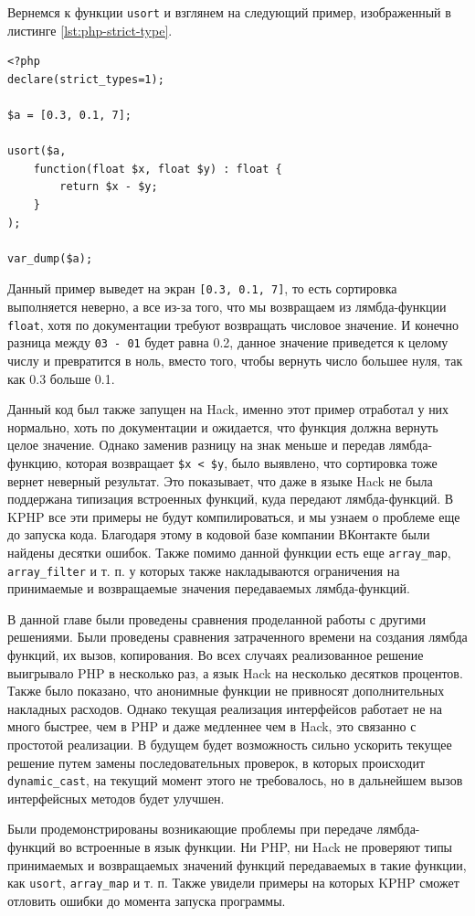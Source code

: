 Вернемся к функции \verb|usort| и взглянем на следующий пример, изображенный в листинге \ref{lst:php-strict-type}.
\begin{lstlisting}[caption={Пример типизации в PHP7}, label={lst:php-strict-type}]
<?php
declare(strict_types=1);

$a = [0.3, 0.1, 7];

usort($a,
    function(float $x, float $y) : float {
        return $x - $y;
    }
);

var_dump($a);
\end{lstlisting}

Данный пример выведет на экран \verb|[0.3, 0.1, 7]|, то есть сортировка выполняется неверно, а все из-за того, что мы возвращаем из лямбда-функции \verb|float|, хотя по документации требуют возвращать числовое значение.
И конечно разница между \verb|03 - 01| будет равна 0.2, данное значение приведется к целому числу и превратится в ноль, вместо того, чтобы вернуть число большее нуля, так как 0.3 больше 0.1.

Данный код был также запущен на Hack, именно этот пример отработал у них нормально, хоть по документации и ожидается, что функция должна вернуть целое значение.
Однако заменив разницу на знак меньше и передав лямбда-функцию, которая возвращает \verb|$x < $y|, было выявлено, что сортировка тоже вернет неверный результат.
Это показывает, что даже в языке Hack не была поддержана типизация встроенных функций, куда передают лямбда-функций.
В KPHP все эти примеры не будут компилироваться, и мы узнаем о проблеме еще до запуска кода.
Благодаря этому в кодовой базе компании ВКонтакте были найдены десятки ошибок.
Также помимо данной функции есть еще \verb|array_map|, \verb|array_filter| и т. п. у которых также накладываются ограничения на принимаемые и возвращаемые значения передаваемых лямбда-функций.

\chapterconclusion
В данной главе были проведены сравнения проделанной работы с другими решениями.
Были проведены сравнения затраченного времени на создания лямбда функций, их вызов, копирования.
Во всех случаях реализованное решение выигрывало PHP в несколько раз, а язык Hack на несколько десятков процентов.
Также было показано, что анонимные функции не привносят дополнительных накладных расходов.
Однако текущая реализация интерфейсов работает не на много быстрее, чем в PHP и даже медленнее чем в Hack, это связанно с простотой реализации.
В будущем будет возможность сильно ускорить текущее решение путем замены последовательных проверок, в которых происходит \verb|dynamic_cast|, на текущий момент этого не требовалось, но в дальнейшем вызов интерфейсных методов будет улучшен.

Были продемонстрированы возникающие проблемы при передаче лямбда-функций во встроенные в язык функции.
Ни PHP, ни Hack не проверяют типы принимаемых и возвращаемых значений функций передаваемых в такие функции, как \verb|usort|, \verb|array_map| и т. п.
Также увидели примеры на которых KPHP сможет отловить ошибки до момента запуска программы.
